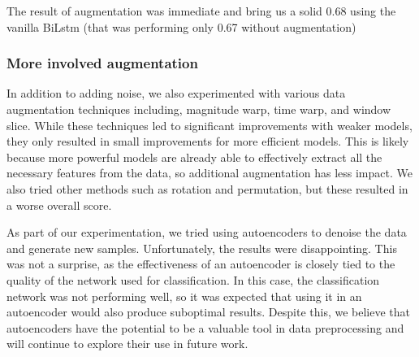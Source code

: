 \documentclass[11pt]{article}
\begin{document}
The result of augmentation was immediate and bring us a solid 0.68 using the vanilla BiLstm (that was performing only 0.67 without augmentation)

\subsubsection{More involved augmentation}
In addition to adding noise, we also experimented with various data augmentation techniques including, magnitude warp, time warp, and window slice.
While these techniques led to significant improvements with weaker models, they only resulted in small improvements for more efficient models.
This is likely because more powerful models are already able to effectively extract all the necessary features from the data, so additional augmentation has less impact.
We also tried other methods such as rotation and permutation, but these resulted in a worse overall score.

As part of our experimentation, we tried using autoencoders to denoise the data and generate new samples.
Unfortunately, the results were disappointing.
This was not a surprise, as the effectiveness of an autoencoder is closely tied to the quality of the network used for classification.
In this case, the classification network was not performing well, so it was expected that using it in an autoencoder would also produce suboptimal results.
Despite this, we believe that autoencoders have the potential to be a valuable tool in data preprocessing and will continue to explore their use in future work.
\end{document}
